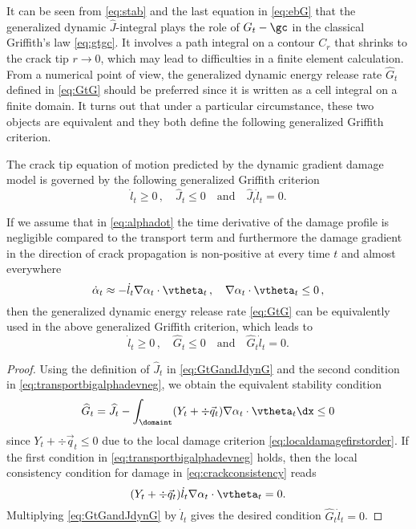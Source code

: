 It can be seen from \eqref{eq:stab} and the last equation in \eqref{eq:ebG} that the generalized dynamic $\widehat{J}$-integral plays the role of $G_t-\gc$ in the classical Griffith's law \eqref{eq:gtgc}. It involves a path integral on a contour $C_r$ that shrinks to the crack tip $r\to 0$, which may lead to difficulties in a finite element calculation. From a numerical point of view, the generalized dynamic energy release rate $\widehat{G}_t$ defined in \eqref{eq:GtG} should be preferred since it is written as a cell integral on a finite domain. It turns out that under a particular circumstance, these two objects are equivalent and they both define the following generalized Griffith criterion.
\begin{proposition} \label{prop:Ggriffithlaw}
The crack tip equation of motion predicted by the dynamic gradient damage model is governed by the following generalized Griffith criterion
\begin{equation} \label{eq:GgriffithlawJ}
\dot{l}_t\geq 0\,,\quad \widehat{J}_t\leq 0\quad\text{and}\quad\widehat{J}_t\dot{l}_t=0.
\end{equation}

If we assume that in \eqref{eq:alphadot} the time derivative of the damage profile is negligible compared to the transport term and furthermore the damage gradient in the direction of crack propagation is non-positive at every time $t$ and almost everywhere
\begin{equation} \label{eq:transportbigalphadevneg}
\dot{\alpha}_t\approx-\dot{l}_t\nabla\alpha_t\cdot\vtheta_t\,,\quad \nabla\alpha_t\cdot\vtheta_t\leq 0\,,
\end{equation}
then the generalized dynamic energy release rate \eqref{eq:GtG} can be equivalently used in the above generalized Griffith criterion, which leads to
\begin{equation} \label{eq:GgriffithlawG}
\dot{l}_t\geq 0\,,\quad \widehat{G}_t\leq 0\quad\text{and}\quad\widehat{G}_t\dot{l}_t=0.
\end{equation}
\end{proposition}

\begin{proof}
Using the definition of $\widehat{J}_t$ in \eqref{eq:GtGandJdynG} and the second condition in \eqref{eq:transportbigalphadevneg}, we obtain the equivalent stability condition
\[
\widehat{G}_t=\widehat{J}_t-\int_\domaint (Y_t+\div\vec{q}_t)\nabla\alpha_t\cdot\vtheta_t\dx\leq 0
\]
since $Y_t+\div\vec{q}_t\leq 0$ due to the local damage criterion \eqref{eq:localdamagefirstorder}. If the first condition in \eqref{eq:transportbigalphadevneg} holds, then the local consistency condition for damage in \eqref{eq:crackconsistency} reads
\[
(Y_t+\div\vec{q}_t)\dot{l}_t\nabla\alpha_t\cdot\vtheta_t=0.
\]
Multiplying \eqref{eq:GtGandJdynG} by $\dot{l}_t$ gives the desired condition $\widehat{G}_t\dot{l}_t=0$.
\end{proof}

